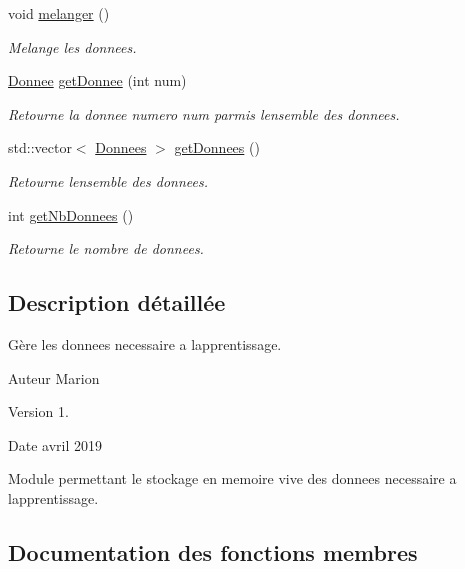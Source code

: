 \begin{DoxyCompactItemize}
\mbox{\label{classDonnees_a722ba74b5e8c6bc0a2f7c16589692ad5}} 
void \hyperlink{classDonnees_a722ba74b5e8c6bc0a2f7c16589692ad5}{melanger} ()
\begin{DoxyCompactList}\small\item\em Melange les donnees. \end{DoxyCompactList}\item 
\hyperlink{classDonnee}{Donnee} \hyperlink{classDonnees_a1986c4b95b3cf90767dbe966b2497ae8}{get\+Donnee} (int num)
\begin{DoxyCompactList}\small\item\em Retourne la donnee numero num parmis l\textquotesingle{}ensemble des donnees. \end{DoxyCompactList}\item 
std\+::vector$<$ \hyperlink{classDonnees}{Donnees} $>$ \hyperlink{classDonnees_acb2f30978cb824d70c39b716c49fe1fa}{get\+Donnees} ()
\begin{DoxyCompactList}\small\item\em Retourne l\textquotesingle{}ensemble des donnees. \end{DoxyCompactList}\item 
int \hyperlink{classDonnees_a4c4da37884b1b91d881524f2a7b91dbc}{get\+Nb\+Donnees} ()
\begin{DoxyCompactList}\small\item\em Retourne le nombre de donnees. \end{DoxyCompactList}\end{DoxyCompactItemize}


\subsection{Description détaillée}
Gère les donnees necessaire a l\textquotesingle{}apprentissage. 

\begin{DoxyAuthor}{Auteur}
Marion 
\end{DoxyAuthor}
\begin{DoxyVersion}{Version}
1. 
\end{DoxyVersion}
\begin{DoxyDate}{Date}
avril 2019
\end{DoxyDate}
Module permettant le stockage en memoire vive des donnees necessaire a l\textquotesingle{}apprentissage. 

\subsection{Documentation des fonctions membres}
\mbox{\label{classDonnees_a7f77ebe53ea55a3293cefb864d60e7ff}} 
